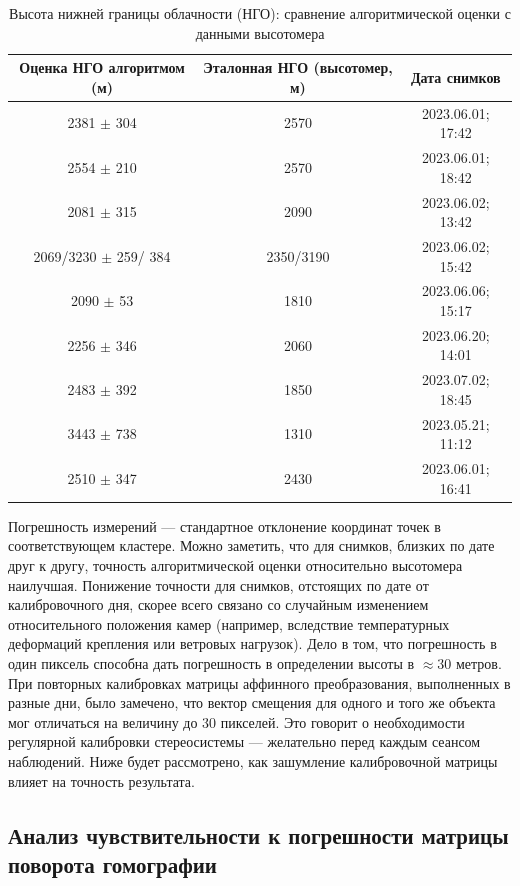 \documentclass[11pt]{article} %
\begin{document}
	\begin{table}[h!]
		\centering
		\begin{tabular}{||c c c||} 
			\hline
			Оценка НГО алгоритмом (м) & Эталонная НГО (высотомер, м) & Дата снимков  \\ [0.5ex] 
			\hline\hline
			2381 $\pm$ 304 & 2570 & 2023.06.01; 17:42 \\
			2554 $\pm$ 210 & 2570 & 2023.06.01; 18:42 \\
			2081 $\pm$ 315 & 2090 & 2023.06.02; 13:42 \\
			2069/3230 $\pm$ 259/ 384 & 2350/3190 & 2023.06.02; 15:42 \\
			2090 $\pm$ 53 & 1810 & 2023.06.06; 15:17 \\
			2256 $\pm$ 346 & 2060 & 2023.06.20; 14:01 \\
			2483 $\pm$ 392 & 1850 & 2023.07.02; 18:45 \\
			3443 $\pm$ 738 & 1310 & 2023.05.21; 11:12 \\
			2510 $\pm$ 347 & 2430 & 2023.06.01; 16:41 \\ [1ex] 
			\hline
		\end{tabular}
		\caption{Высота нижней границы облачности (НГО): сравнение алгоритмической оценки с данными высотомера}
		\label{table:1}
	\end{table}
	
	Погрешность измерений --- стандартное отклонение координат точек в соответствующем кластере. Можно заметить, что для снимков, близких по дате друг к другу, точность алгоритмической оценки относительно высотомера наилучшая. Понижение точности для снимков, отстоящих по дате от калибровочного дня, скорее всего связано со случайным изменением относительного положения камер (например, вследствие температурных деформаций крепления или ветровых нагрузок). Дело в том, что
	погрешность в один пиксель способна дать погрешность в определении высоты в
	$\approx 30$ метров. При повторных калибровках матрицы аффинного преобразования, выполненных в разные дни, было замечено, что вектор смещения для одного и того же объекта мог отличаться на величину до 30 пикселей. Это говорит о необходимости регулярной калибровки стереосистемы --- желательно перед каждым сеансом наблюдений. Ниже будет рассмотрено, как
	зашумление калибровочной матрицы влияет на точность результата.
	
\subsection{Анализ чувствительности к погрешности матрицы поворота гомографии}
\vspace{3mm}\hspace{5mm}
\end{document}
